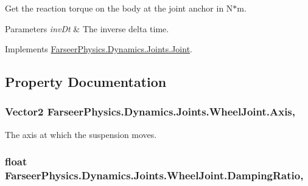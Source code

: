 Get the reaction torque on the body at the joint anchor in N$\ast$m. 


\begin{DoxyParams}{Parameters}
{\em inv\+Dt} & The inverse delta time.\\
\hline
\end{DoxyParams}


Implements \hyperlink{class_farseer_physics_1_1_dynamics_1_1_joints_1_1_joint_a21899d3bdf15c22ef4dc288ed2082cbc}{Farseer\+Physics.\+Dynamics.\+Joints.\+Joint}.



\subsection{Property Documentation}
\hypertarget{class_farseer_physics_1_1_dynamics_1_1_joints_1_1_wheel_joint_aa262723cbde47316eb6ba8451ad141d4}{
\subsubsection[{Axis}]{\setlength{\rightskip}{0pt plus 5cm}Vector2 Farseer\+Physics.\+Dynamics.\+Joints.\+Wheel\+Joint.\+Axis\hspace{0.3cm}{\ttfamily [get]}, {\ttfamily [set]}}}\label{class_farseer_physics_1_1_dynamics_1_1_joints_1_1_wheel_joint_aa262723cbde47316eb6ba8451ad141d4}


The axis at which the suspension moves. 

\hypertarget{class_farseer_physics_1_1_dynamics_1_1_joints_1_1_wheel_joint_a3a0f9dbb34ee64d4ea7b91d5d2c10b5c}{
\subsubsection[{Damping\+Ratio}]{\setlength{\rightskip}{0pt plus 5cm}float Farseer\+Physics.\+Dynamics.\+Joints.\+Wheel\+Joint.\+Damping\+Ratio\hspace{0.3cm}{\ttfamily [get]}, {\ttfamily [set]}}}\label{class_farseer_physics_1_1_dynamics_1_1_joints_1_1_wheel_joint_a3a0f9dbb34ee64d4ea7b91d5d2c10b5c}


